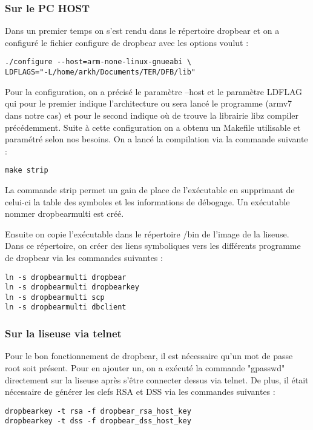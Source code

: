 \subsubsection{Sur le PC HOST}
Dans un premier temps on s'est rendu dans le répertoire dropbear et on a configuré le fichier configure de dropbear avec les options voulut :

\begin{lstlisting}
./configure --host=arm-none-linux-gnueabi \
LDFLAGS="-L/home/arkh/Documents/TER/DFB/lib"
\end{lstlisting} 

Pour la configuration, on a précisé le paramètre --host et le paramètre LDFLAG qui pour le premier indique l'architecture ou sera lancé le programme (armv7 dans notre cas) et pour le second indique où de trouve la librairie libz compiler précédemment.
Suite à cette configuration on a obtenu un Makefile utilisable et paramétré selon nos besoins.
On a lancé la compilation via la commande suivante :

\begin{lstlisting}
make strip
\end{lstlisting}

La commande strip permet un gain de place de l'exécutable en supprimant de celui-ci la table des symboles et les informations de débogage. Un exécutable nommer dropbearmulti est créé.

Ensuite on copie l'exécutable dans le répertoire /bin de l'image de la liseuse. Dans ce répertoire, on créer des liens symboliques vers les différents programme de dropbear via les commandes suivantes :

\begin{lstlisting}
ln -s dropbearmulti dropbear
ln -s dropbearmulti dropbearkey
ln -s dropbearmulti scp
ln -s dropbearmulti dbclient
\end{lstlisting}  

\subsubsection{Sur la liseuse via telnet}

Pour le bon fonctionnement de dropbear, il est nécessaire qu'un mot de passe root soit présent. Pour en ajouter un, on a exécuté la commande "gpasswd" directement sur la liseuse après s'être connecter dessus via telnet.
De plus, il était nécessaire de générer les clefs RSA et DSS via les commandes suivantes :

\begin{lstlisting}
dropbearkey -t rsa -f dropbear_rsa_host_key
dropbearkey -t dss -f dropbear_dss_host_key
\end{lstlisting}

